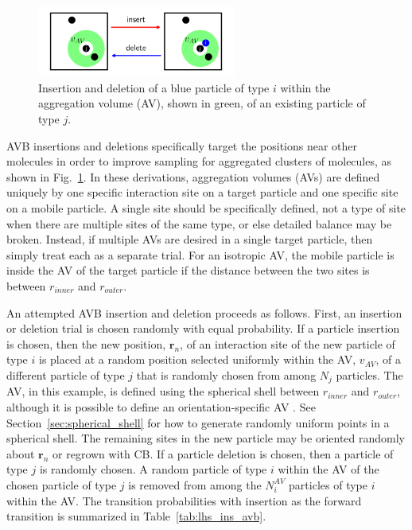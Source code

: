 \documentclass[
  9pt,
  bestpractices,
  pubversion,
]{livecoms}
\begin{document}
\begin{figure}
\begin{centering}
\includegraphics[width=6.5cm]{../figures/avb.pdf}
\caption{
Insertion and deletion of a blue particle of type $i$ within the aggregation volume (AV), shown in green, of an existing particle of type $j$.
}
\label{fig:avb_gce}
\end{centering}
\end{figure}

AVB insertions and deletions specifically target the positions near other molecules \cite{chen_improving_2001} in order to improve sampling for aggregated clusters of molecules, as shown in Fig.~\ref{fig:avb_gce}.
In these derivations, aggregation volumes (AVs) are defined uniquely by one specific interaction site on a target particle and one specific site on a mobile particle.
A single site should be specifically defined, not a type of site when there are multiple sites of the same type, or else detailed balance may be broken.
Instead, if multiple AVs are desired in a single target particle, then simply treat each as a separate trial.
For an isotropic AV, the mobile particle is inside the AV of the target particle if the distance between the two sites is between $r_{inner}$ and $r_{outer}$.

An attempted AVB insertion and deletion proceeds as follows.
First, an insertion or deletion trial is chosen randomly with equal probability.
If a particle insertion is chosen, then the new position, $\mathbf{r}_n$, of an interaction site of the new particle of type $i$ is placed at a random position selected uniformly within the AV, $v_{AV}$, of a different particle of type $j$ that is randomly chosen from among $N_j$ particles.
The AV, in this example, is defined using the spherical shell between $r_{inner}$ and $r_{outer}$, although it is possible to define an orientation-specific AV \cite{rovigatti_how_2018}.
See Section~\ref{sec:spherical_shell} for how to generate randomly uniform points in a spherical shell.
The remaining sites in the new particle may be oriented randomly about $\mathbf{r}_n$ or regrown with CB.
If a particle deletion is chosen, then a particle of type $j$ is randomly chosen.
A random particle of type $i$ within the AV of the chosen particle of type $j$ is removed from among the $N_i^{AV}$ particles of type $i$ within the AV.
The transition probabilities with insertion as the forward transition is summarized in Table~\ref{tab:lhs_ins_avb}.
\end{document}
